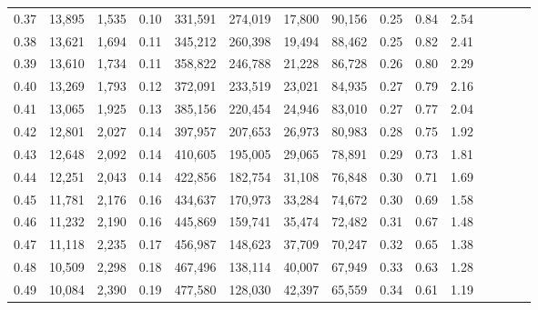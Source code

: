 \begin{tabular}{rrrcrrrrrrrrrrr}
0.37 &  13,895 &  1,535 &                                       0.10 &  331,591 &  274,019 &   17,800 &   90,156 &  0.25 &  0.84 &                         2.54 \\
0.38 &  13,621 &  1,694 &                                       0.11 &  345,212 &  260,398 &   19,494 &   88,462 &  0.25 &  0.82 &                         2.41 \\
0.39 &  13,610 &  1,734 &                                       0.11 &  358,822 &  246,788 &   21,228 &   86,728 &  0.26 &  0.80 &                         2.29 \\
0.40 &  13,269 &  1,793 &                                       0.12 &  372,091 &  233,519 &   23,021 &   84,935 &  0.27 &  0.79 &                         2.16 \\
0.41 &  13,065 &  1,925 &                                       0.13 &  385,156 &  220,454 &   24,946 &   83,010 &  0.27 &  0.77 &                         2.04 \\
0.42 &  12,801 &  2,027 &                                       0.14 &  397,957 &  207,653 &   26,973 &   80,983 &  0.28 &  0.75 &                         1.92 \\
0.43 &  12,648 &  2,092 &                                       0.14 &  410,605 &  195,005 &   29,065 &   78,891 &  0.29 &  0.73 &                         1.81 \\
0.44 &  12,251 &  2,043 &                                       0.14 &  422,856 &  182,754 &   31,108 &   76,848 &  0.30 &  0.71 &                         1.69 \\
0.45 &  11,781 &  2,176 &                                       0.16 &  434,637 &  170,973 &   33,284 &   74,672 &  0.30 &  0.69 &                         1.58 \\
0.46 &  11,232 &  2,190 &                                       0.16 &  445,869 &  159,741 &   35,474 &   72,482 &  0.31 &  0.67 &                         1.48 \\
0.47 &  11,118 &  2,235 &                                       0.17 &  456,987 &  148,623 &   37,709 &   70,247 &  0.32 &  0.65 &                         1.38 \\
0.48 &  10,509 &  2,298 &                                       0.18 &  467,496 &  138,114 &   40,007 &   67,949 &  0.33 &  0.63 &                         1.28 \\
0.49 &  10,084 &  2,390 &                                       0.19 &  477,580 &  128,030 &   42,397 &   65,559 &  0.34 &  0.61 &                         1.19 \\

\end{tabular}

